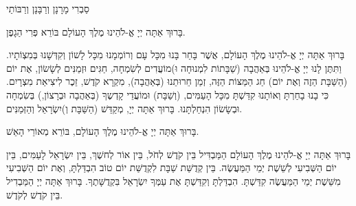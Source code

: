 

\begin{framed}

\end{framed}

סַבְרִי מָרָנָן וְרַבָּנָן וְרַבּוֹתַי

בָּרוּךְ אַתָּה יְיָ אֱ-לֹהֵינוּ מֶלֶךְ הָעוֹלָם בּוֹרֵא פְּרִי הַגָפֶן.


בָּרוּךְ אַתָּה יְיָ אֱ-לֹהֵינוּ מֶלֶךְ הָעוֹלָם, אֲשֶׁר בָּחַר בָּנוּ מִכָּל עָם וְרוֹמְמָנוּ מִכָּל לָשׁוֹן וְקִדְּשָׁנוּ בְּמִצְוֹתָיו. וַתִּתֶּן לָנוּ יְיָ אֱ-לֹהֵינוּ בְּאַהֲבָה (שַׁבָּתוֹת לִמְנוּחָה וּ)מוֹעֲדִים לְשִׂמְחָה, חַגִּים וּזְמַנִּים לְשָׂשׂוֹן, אֶת יוֹם (הַשַּׁבָּת הַזֶה וְאֶת יוֹם) חַג הַמַּצּוֹת הַזֶּה, זְמַן חֵרוּתֵנוּ (בְּאַהֲבָה), מִקְרָא קֹדֶשׁ, זֵכֶר לִיצִיאַת מִצְרָיִם. כִּי בָנוּ בָחַרְתָּ וְאוֹתָנוּ קִדַּשְׁתָּ מִכָּל הָעַמִּים, (וְשַׁבָּת) וּמוֹעֲדֵי קָדְשֶךָ (בְּאַהֲבָה וּבְרָצוֹן,) בְּשִׂמְחָה וּבְשָׂשׂוֹן הִנְחַלְתָּנוּ. בָּרוּךְ אַתָּה יְיָ, מְקַדֵּשׁ (הַשַּׁבָּת וְ)יִשְׂרָאֵל וְהַזְּמַנִּים.

\begin{framed}

בָּרוּךְ אַתָּה יְיָ אֱ-לֹהֵינוּ מֶלֶךְ הָעוֹלָם, בּוֹרֵא מְאוֹרֵי הָאֵשׁ.

בָּרוּךְ אַתָּה יְיָ אֱ-לֹהֵינוּ מֶלֶךְ הָעוֹלָם הַמַּבְדִּיל בֵּין קֹדֶשׁ לְחֹל, בֵּין אוֹר לְחשֶׁךְ, בֵּין יִשְׂרָאֵל לָעַמִּים, בֵּין יוֹם הַשְּׁבִיעִי לְשֵׁשֶׁת יְמֵי הַמַּעֲשֶׂה. בֵּין קְדֻשַּׁת שַׁבָּת לִקְדֻשַּׁת יוֹם טוֹב הִבְדַּלְתָּ, וְאֶת יוֹם הַשְּׁבִיעִי מִשֵּׁשֶׁת יְמֵי הַמַּעֲשֶׂה קִדַּשְׁתָּ. הִבְדַּלְתָּ וְקִדַּשְׁתָּ אֶת עַמְּךָ יִשְׂרָאֵל בִּקְדֻשָּׁתֶךָ. בָּרוּךְ אַתָּה יְיָ הַמַּבְדִיל בֵּין קֹדֶשׁ לְקֹדֶשׁ.
\end{framed}

\ \\

